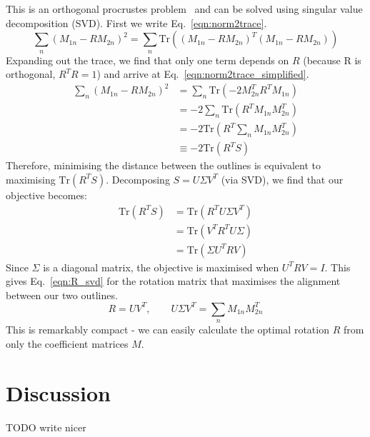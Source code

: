 \documentclass[11pt,a4paper,notitlepage]{article}
\begin{document}
This is an orthogonal procrustes problem~\cite{Gower2004} and can be solved using singular value decomposition (SVD).
First we write Eq.~\ref{eqn:norm2trace}.
\begin{equation}
	\label{eqn:norm2trace}
	\sum_n \left(M_{1n} - RM_{2n}\right)^2 = \sum_n \mathrm{Tr}\left((M_{1n} - RM_{2n})^T (M_{1n} - RM_{2n})\right)
\end{equation}
Expanding out the trace, we find that only one term depends on $R$ (because R is orthogonal, $R^TR = 1$)
and arrive at Eq.~\ref{eqn:norm2trace_simplified}.
\begin{equation}
	\label{eqn:norm2trace_simplified}
	\begin{aligned}
		\sum_n \left(M_{1n} - RM_{2n}\right)^2
		 & = \sum_n \mathrm{Tr}\left(-2M_{2n}^T R^T M_{1n}\right) \\
		 & = -2\sum_n \mathrm{Tr}\left(R^TM_{1n}M_{2n}^T\right)   \\
		 & = -2\mathrm{Tr}\left(R^T\sum_n M_{1n}M_{2n}^T\right)   \\
		 & \equiv -2\mathrm{Tr}\left(R^T S\right)
	\end{aligned}
\end{equation}
Therefore, minimising the distance between the outlines is equivalent to maximising $\mathrm{Tr}\left(R^T S\right)$.
Decomposing $S = U\Sigma V^T$ (via SVD), we find that our objective becomes:
\begin{equation}
	\label{eqn:svd_traces}
	\begin{aligned}
		\mathrm{Tr}\left(R^T S\right)
		 & = \mathrm{Tr}\left(R^TU\Sigma V^T\right)  \\
		 & = \mathrm{Tr}\left(V^TR^TU\Sigma\right)   \\
		 & =  \mathrm{Tr}\left(\Sigma U^T R V\right)
	\end{aligned}
\end{equation}
Since $\Sigma$ is a diagonal matrix, the objective is maximised when $U^TRV = I$.
This gives Eq.~\ref{eqn:R_svd} for the rotation matrix that maximises the alignment between our two outlines.
\begin{equation}
	\label{eqn:R_svd}
	R = UV^T,\qquad U\Sigma V^T = \sum_nM_{1n}M_{2n}^T
\end{equation}
This is remarkably compact - we can easily calculate the optimal rotation $R$ from only the coefficient matrices $M$.

\section{Discussion}
TODO write nicer
\end{document}
